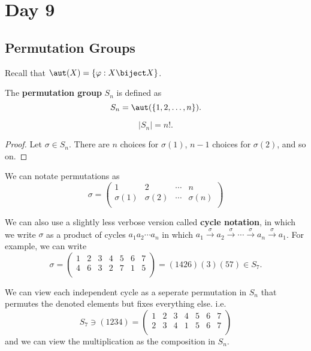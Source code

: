 \section{Day 9}

\subsection{Permutation Groups}

Recall that $\aut(X) = \lbrace \varphi : X \biject X \rbrace$.

\begin{df}
The \textbf{permutation group} $S_n$ is defined as
\[ S_n = \aut(\lbrace 1, 2, \dots, n \rbrace). \]
\end{df}

\begin{rem}
\[ |S_n| = n!. \]
\end{rem}

\begin{proof}
Let $\sigma \in S_n$. There are $n$ choices for $\sigma(1)$, $n - 1$
choices for $\sigma(2)$, and so on.
\end{proof}

We can notate permutations as
\[ \sigma = \begin{pmatrix}
1 & 2 & \cdots & n \\
\sigma(1) & \sigma(2) & \cdots & \sigma(n) \\
\end{pmatrix} \]

We can also use a slightly less verbose version called \textbf{cycle
notation}, in which we write $\sigma$ as a product of cycles $a_1 a_2
\cdots a_n$ in which $a_1 \xrightarrow{\sigma} a_2 \xrightarrow{\sigma}
\cdots \xrightarrow{\sigma} a_n \xrightarrow{\sigma} a_1$. For example,
we can write
\[ \sigma = \begin{pmatrix}
1 & 2 & 3 & 4 & 5 & 6 & 7 \\
4 & 6 & 3 & 2 & 7 & 1 & 5 \\
\end{pmatrix} = (1426)(3)(57) \in S_7. \]

We can view each independent cycle as a seperate permutation in $S_n$
that permutes the denoted elements but fixes everything else. i.e.
\[ S_7 \ni (1234) = \begin{pmatrix}
1 & 2 & 3 & 4 & 5 & 6 & 7 \\
2 & 3 & 4 & 1 & 5 & 6 & 7 \\
\end{pmatrix} \]
and we can view the multiplication as the composition in $S_n$.


